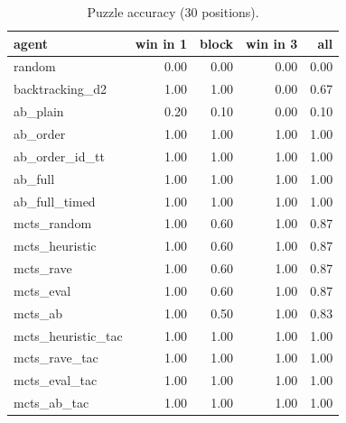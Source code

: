 \begin{table}[ht]
\centering
\begin{tabular}{lrrrr}
\toprule
agent & win in 1 & block & win in 3 & all \\
\midrule
random & 0.00 & 0.00 & 0.00 & 0.00 \\
backtracking\_d2 & 1.00 & 1.00 & 0.00 & 0.67 \\
ab\_plain & 0.20 & 0.10 & 0.00 & 0.10 \\
ab\_order & 1.00 & 1.00 & 1.00 & 1.00 \\
ab\_order\_id\_tt & 1.00 & 1.00 & 1.00 & 1.00 \\
ab\_full & 1.00 & 1.00 & 1.00 & 1.00 \\
ab\_full\_timed & 1.00 & 1.00 & 1.00 & 1.00 \\
mcts\_random & 1.00 & 0.60 & 1.00 & 0.87 \\
mcts\_heuristic & 1.00 & 0.60 & 1.00 & 0.87 \\
mcts\_rave & 1.00 & 0.60 & 1.00 & 0.87 \\
mcts\_eval & 1.00 & 0.60 & 1.00 & 0.87 \\
mcts\_ab & 1.00 & 0.50 & 1.00 & 0.83 \\
mcts\_heuristic\_tac & 1.00 & 1.00 & 1.00 & 1.00 \\
mcts\_rave\_tac & 1.00 & 1.00 & 1.00 & 1.00 \\
mcts\_eval\_tac & 1.00 & 1.00 & 1.00 & 1.00 \\
mcts\_ab\_tac & 1.00 & 1.00 & 1.00 & 1.00 \\
\bottomrule
\end{tabular}
\caption{Puzzle accuracy (30 positions).}
\label{tab:puzzles}
\end{table}
